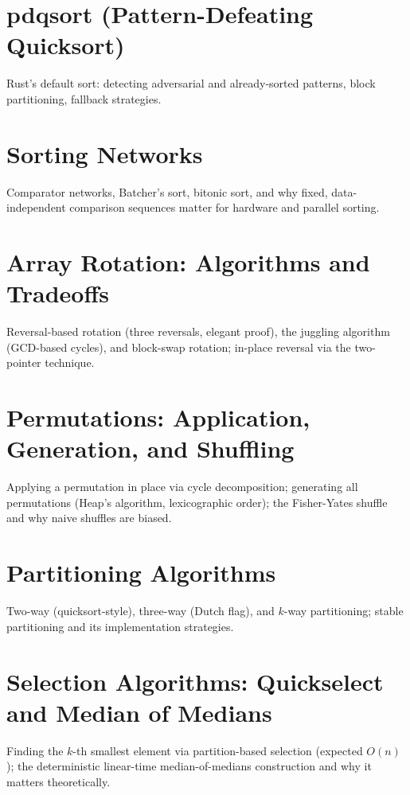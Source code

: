 \chapter{pdqsort (Pattern-Defeating Quicksort)}
Rust's default sort: detecting adversarial and already-sorted patterns, block partitioning, fallback strategies.

\chapter{Sorting Networks}
Comparator networks, Batcher's sort, bitonic sort, and why fixed, data-independent comparison sequences matter for hardware and parallel sorting.


\chapter{Array Rotation: Algorithms and Tradeoffs}
Reversal-based rotation (three reversals, elegant proof), the juggling algorithm (GCD-based cycles), and block-swap rotation; in-place reversal via the two-pointer technique.

\chapter{Permutations: Application, Generation, and Shuffling}
Applying a permutation in place via cycle decomposition; generating all permutations (Heap's algorithm, lexicographic order); the Fisher-Yates shuffle and why naive shuffles are biased.

\chapter{Partitioning Algorithms}
Two-way (quicksort-style), three-way (Dutch flag), and $k$-way partitioning; stable partitioning and its implementation strategies.

\chapter{Selection Algorithms: Quickselect and Median of Medians}
Finding the $k$-th smallest element via partition-based selection (expected $O(n)$); the deterministic linear-time median-of-medians construction and why it matters theoretically.


